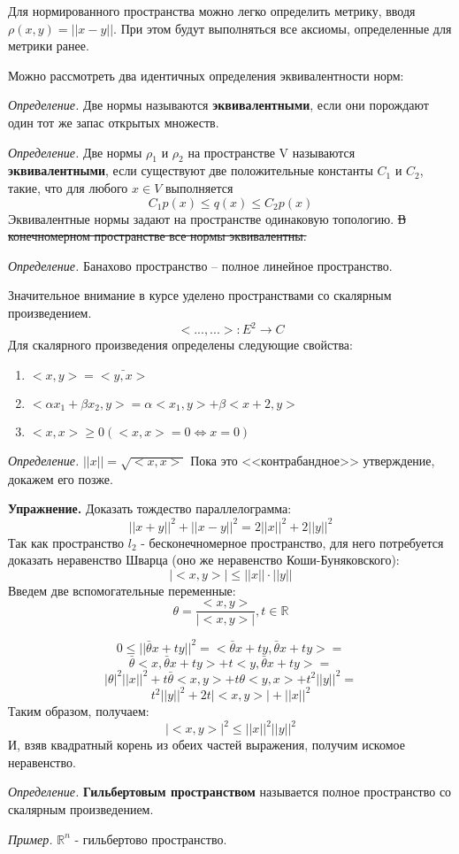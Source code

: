 \documentclass[12pt]{article}
\newcommand{\example}{{\itshape Пример. }}
\newcommand{\equals}{\Leftrightarrow}
\newcommand{\defi}{{\itshape Определение. }}
\newcommand{\exc}{{\bfseries Упражнение. }}
\renewcommand{\leq}{\leqslant}
\renewcommand{\geq}{\geqslant}
\begin{document}
	Для нормированного пространства можно легко определить метрику, вводя $\rho(x,y) = ||x-y||$. При этом будут выполняться все аксиомы,
	определенные для метрики ранее.
	
	Можно рассмотреть два идентичных определения эквивалентности норм:
	
	\defi Две нормы называются \textbf{эквивалентными}, если они порождают один тот же запас открытых множеств.
	
	\defi Две нормы $\rho_1$ и $\rho_2$ на пространстве V называются \textbf{эквивалентными}, если существуют две положительные константы 
	$C_1$ и $C_2$, такие, что для любого $x \in V$ выполняется 
	$$C_1 p(x) \leq q(x) \leq C_2 p(x)$$
	Эквивалентные нормы задают на пространстве одинаковую топологию. \sout{В конечномерном пространстве все нормы эквивалентны.}
	
	\defi Банахово пространство -- полное линейное пространство.
	
	Значительное внимание в курсе уделено пространствами со скалярным произведением.
	$$<...,...> : E^2 \rightarrow C$$
	Для скалярного произведения определены следующие свойства:
	\begin{enumerate}
		\item $<x,y> = \bar{<y,x>}$
		\item $<\alpha x_1 + \beta x_2, y> = \alpha <x_1, y> + \beta <x+2, y>$
		\item $<x, x> \geq 0 (<x, x> = 0 \equals x = 0)$
	\end{enumerate}
	
	\defi $||x|| = \sqrt{<x, x>}$ {\color{gray} Пока это <<контрабандное>> утверждение, докажем его позже.}
	
	\exc Доказать тождество параллелограмма: 
	$$||x+y||^2 + ||x-y||^2 = 2 ||x||^2 + 2 ||y||^2$$
	Так как пространство $l_2$ - бесконечномерное пространство, для него потребуется доказать неравенство Шварца (оно же неравенство
	Коши-Буняковского):
	$$|<x, y>| \leq ||x|| \cdot ||y||$$
	Введем две вспомогательные переменные:
	$$\theta = \frac{<x, y>}{|<x, y>|}, t \in \mathbb{R}$$
	
	$$0 \leq ||\bar{\theta} x + t y||^2 = <\bar{\theta} x + t y, \bar{\theta} x + t y> = $$
	$$\bar{\theta} <x, \bar{\theta} x + t y> + t <y, \bar{\theta} x + t y> = $$
	$$|\theta|^2 ||x||^2 + t \bar{\theta} <x, y> + t \theta <y, x> + t^2 ||y||^2 = $$
	$$t^2 ||y||^2 + 2t |<x,y>| + ||x||^2$$
	Таким образом, получаем:
	$$|<x, y>|^2 \leq ||x||^2 ||y||^2$$
	И, взяв квадратный корень из обеих частей выражения, получим искомое неравенство.
	
	\defi \textbf{Гильбертовым пространством} называется полное пространство со скалярным произведением.
	
	\example $\mathbb{R}^n$ - гильбертово пространство.
\end{document}
